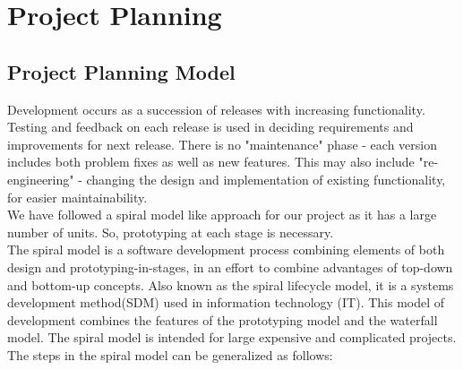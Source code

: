 \chapter{Project Planning}
\section{Project Planning Model}
\hspace*{0.82cm}Development occurs as a succession of releases with increasing functionality. Testing and feedback on each release is 
used in deciding requirements and improvements for next release. There is no "maintenance" phase - each version includes both problem 
fixes as well as new features. This may also include "re-engineering" - changing the design and implementation of existing 
functionality, for easier maintainability.\\[0.5cm]
\hspace*{0.82cm}We have followed a spiral model like approach for our project as it has a large number of units. 
So, prototyping at each stage is necessary.\\[0.5cm]
\hspace*{0.82cm}The spiral model is a software development process combining elements of both design and prototyping-in-stages, 
in an effort to combine advantages of top-down and bottom-up concepts. Also known as the spiral lifecycle model, it is a systems 
development method(SDM) used in information technology (IT). This model of development combines the features of the prototyping 
model and the waterfall model. The spiral model is intended for large expensive and complicated projects.\\[0.5cm]
The steps in the spiral model can be generalized as follows:
